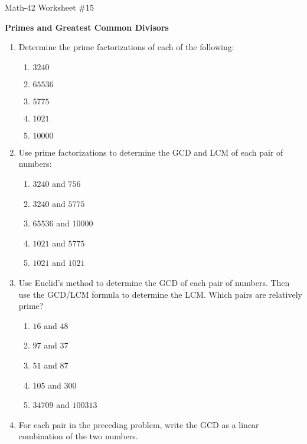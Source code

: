 \documentclass[letterpaper,12pt,fleqn]{article}
\begin{document}
\begin{center}
  \large Math-42 Worksheet \#15

  \textbf{Primes and Greatest Common Divisors}
\end{center}

\vspace{0.5in}

\begin{enumerate}[left=0in,itemsep=0.5in]
\item Determine the prime factorizations of each of the following:
  \begin{enumerate}
  \item \(3240\)
  \item \(65536\)
  \item \(5775\)
  \item \(1021\)
  \item \(10000\)
  \end{enumerate}

\item Use prime factorizations to determine the GCD and LCM of each pair of numbers:
  \begin{enumerate}
  \item \(3240\) and \(756\)
  \item \(3240\) and \(5775\)
  \item \(65536\) and \(10000\)
  \item \(1021\) and \(5775\)
  \item \(1021\) and \(1021\)
  \end{enumerate}

\item Use Euclid's method to determine the GCD of each pair of numbers.  Then use the GCD/LCM formula to determine
  the LCM.  Which pairs are relatively prime?
  \begin{enumerate}
  \item \(16\) and \(48\)
  \item \(97\) and \(37\)
  \item \(51\) and \(87\)
  \item \(105\) and \(300\)
  \item \(34709\) and \(100313\)
  \end{enumerate}

\item For each pair in the preceding problem, write the GCD as a linear combination of the two numbers.
\end{enumerate}
\end{document}
